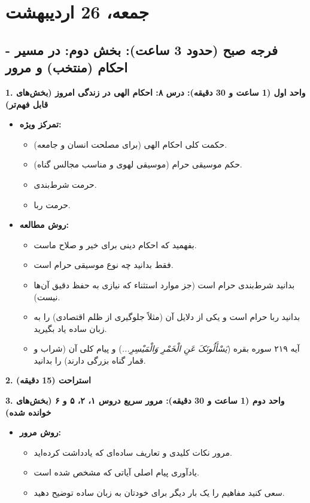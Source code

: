 \documentclass[12pt,a4paper]{article}
\newcommand{\quranverse}[1]{\textit{#1}}
\begin{document}
\pagebreak %
\section*{جمعه، 26 اردیبهشت}

\subsection*{فرجه صبح (حدود 3 ساعت): بخش دوم: در مسیر - احکام (منتخب) و مرور}

\textbf{1. واحد اول (1 ساعت و 30 دقیقه): درس ۸: احکام الهی در زندگی امروز (بخش‌های قابل فهم‌تر)}
\begin{itemize}
    \item \textbf{تمرکز ویژه:}
    \begin{itemize}
        \item حکمت کلی احکام الهی (برای مصلحت انسان و جامعه).
        \item حکم موسیقی حرام (موسیقی لهوی و مناسب مجالس گناه).
        \item حرمت شرط‌بندی.
        \item حرمت ربا.
    \end{itemize}
    \item \textbf{روش مطالعه:}
    \begin{itemize}
        \item بفهمید که احکام دینی برای خیر و صلاح ماست.
        \item فقط بدانید چه نوع موسیقی حرام است.
        \item بدانید شرط‌بندی حرام است (جز موارد استثناء که نیازی به حفظ دقیق آن‌ها نیست).
        \item بدانید ربا حرام است و یکی از دلایل آن (مثلاً جلوگیری از ظلم اقتصادی) را به زبان ساده یاد بگیرید.
        \item آیه ۲۱۹ سوره بقره (\quranverse{یَسْأَلُونَکَ عَنِ الْخَمْرِ وَالْمَیْسِرِ...}) و پیام کلی آن (شراب و قمار گناه بزرگی دارند) را بدانید.
    \end{itemize}
\end{itemize}

\textbf{2. استراحت (15 دقیقه)}
\vspace{0.5em}

\textbf{3. واحد دوم (1 ساعت و 30 دقیقه): مرور سریع دروس ۱، ۲، ۵ و ۶ (بخش‌های خوانده شده)}
\begin{itemize}
    \item \textbf{روش مرور:}
    \begin{itemize}
        \item مرور نکات کلیدی و تعاریف ساده‌ای که یادداشت کرده‌اید.
        \item یادآوری پیام اصلی آیاتی که مشخص شده است.
        \item سعی کنید مفاهیم را یک بار دیگر برای خودتان به زبان ساده توضیح دهید.
    \end{itemize}
\end{itemize}
\end{document}
